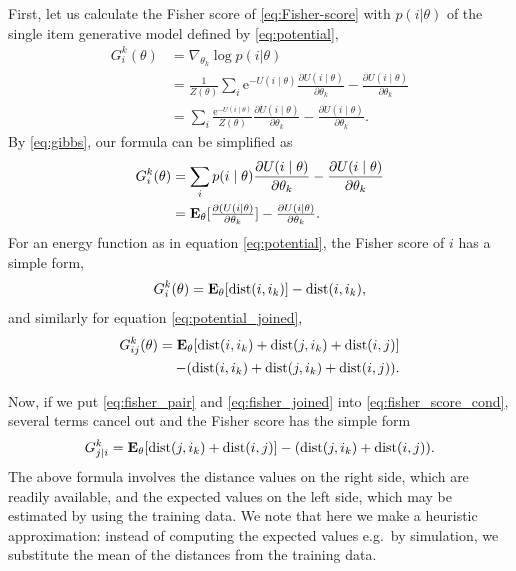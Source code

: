\documentclass[preprint]{sig-alternate-05-2015}
\begin{document}
First, let us calculate the Fisher score of \eqref{eq:Fisher-score} with $p (i|\theta)$ of the single item generative model defined by \eqref{eq:potential}, 
%
\begin{equation}
\begin{split}
    G_i^k(\theta) &=\nabla_{\theta_k} \log p(i|\theta)\\
          &= \frac{1}{Z(\theta)}\sum_{i} \mathrm{e}^{-U(i \mid \theta)} \frac{\partial{U(i \mid \theta)}}{\partial{\theta_k}} - \frac{\partial{U(i \mid \theta)}}{\partial{\theta_k}} \\
          &= \sum_{i} \frac{\mathrm{e}^{-U(i \mid \theta)}}{Z(\theta)} \frac{\partial{U(i \mid \theta)}}{\partial{\theta_k}} - \frac{\partial{U(i \mid \theta)}}{\partial{\theta_k}}.
\end{split}
\nonumber
\end{equation}
%
By \eqref{eq:gibbs}, our formula can be simplified as 
%
\begin{equation}
\begin{split}
    G_i^k(\theta) &= \sum_{i} p(i \mid \theta) \frac{\partial{U(i \mid \theta)}}{\partial{\theta_k}} - \frac{\partial{U(i \mid \theta)}}{\partial{\theta_k}} \\
    				 &= {\textstyle {\bf E_{\theta}}[\frac{\partial{(U(i \mid \theta)}}{\partial{\theta_k}}] - \frac{\partial{U(i \mid \theta)}}{\partial{\theta_k}}.}
\end{split}
\label{eq:gix}
\end{equation}
%
For an energy function as in equation \eqref{eq:potential}, the Fisher score of $i$ has a simple form,
%
\begin{equation}
    G_i^k(\theta)= {\bf E_{\theta}}[\mbox{dist}(i,i_k)] - \mbox{dist}(i,i_k),
\label{eq:fisher_pair}
\end{equation} 
%
and similarly for equation \eqref{eq:potential_joined}, 
%
\begin{equation}
\begin{split}
    G_{ij}^{k}(\theta) = {\bf E_{\theta}}[\mbox{dist}(i,i_k) + \mbox{dist}(j,i_k)+\mbox{dist}(i,j)] \\
    - (\mbox{dist}(i,i_k)+ \mbox{dist}(j,i_k)+\mbox{dist}(i,j)). 
\end{split}
\label{eq:fisher_joined}
\end{equation} 

Now, if we put \eqref{eq:fisher_pair} and \eqref{eq:fisher_joined} into \eqref{eq:fisher_score_cond}, several terms cancel out and the Fisher score has the simple form
%
\begin{equation}
G_{j|i}^k = {\bf E_{\theta}}[\mbox{dist}(j,i_k) + \mbox{dist}(i,j)] - (\mbox{dist}(j,i_k) + \mbox{dist}(i,j)).
\nonumber
\end{equation}
The above formula involves the distance values on the right side, which are readily available, and the expected values on the left side, which may be estimated by using the training data. We note that here we make a heuristic approximation: instead of computing the expected values e.g.\ by simulation, we substitute the mean of the distances from the training data.
\end{document}
